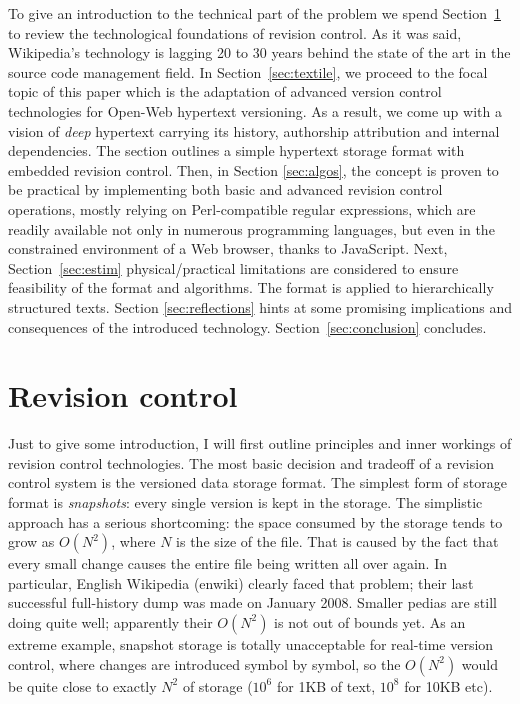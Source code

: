 \documentclass{acm_proc_article-sp}
\begin{document}
To give an introduction to the technical part of the problem we spend Section~\ref{sec:scm} to review the technological foundations of revision control. As it was said, Wikipedia's technology is lagging 20 to 30 years behind the state of the art in the source code management field. 
In Section~\ref{sec:textile}, we proceed to the focal topic of this paper which is the adaptation of advanced version control technologies for Open-Web hypertext versioning. As a result, we come up with a vision of \emph{deep} hypertext carrying its history, authorship attribution and internal dependencies.
The section outlines a simple hypertext storage format with embedded revision control.
Then, in Section \ref{sec:algos}, the concept is proven to be practical by implementing both basic and advanced revision control operations, mostly relying on Perl-compatible regular expressions, which are readily available not only in numerous programming languages, but even in the constrained environment of a Web browser, thanks to JavaScript.
Next, Section~\ref{sec:estim} physical/practical limitations are considered to ensure feasibility of the format and algorithms. The format is applied to hierarchically structured texts.
Section \ref{sec:reflections} hints at some promising implications and consequences of the introduced technology.
Section~\ref{sec:conclusion} concludes.



\section{Revision control} \label{sec:scm}

Just to give some introduction, I will first outline principles and inner workings of revision control technologies.
The most basic decision and tradeoff of a revision control system is the versioned data storage format.
The simplest form of storage format is \emph{snapshots}: every single  version is kept in the storage.
The simplistic approach has a serious shortcoming: the space consumed by the storage tends to grow as $O(N^2)$, where $N$ is the size of the file.
That is caused by the fact that every small change causes the entire file being written all over again.
In particular, English Wikipedia (enwiki) clearly faced that problem; their last successful full-history dump was made on January 2008.
Smaller pedias are still doing quite well; apparently their $O(N^2)$ is not out of bounds yet.
As an extreme example, snapshot storage is totally unacceptable for real-time version control, where changes are introduced symbol by symbol, so the $O(N^2)$ would be quite close to exactly $N^2$ of storage ($10^{6}$ for 1KB of text, $10^{8}$ for 10KB etc).
\end{document}
